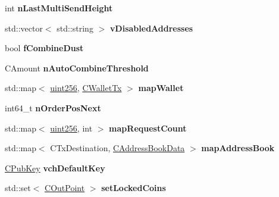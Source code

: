 \begin{DoxyCompactItemize}
\item 
\mbox{\label{class_c_wallet_a600b9d6c61622bf8d21f41c9968cbdc4}} 
int {\bfseries n\+Last\+Multi\+Send\+Height}
\item 
\mbox{\label{class_c_wallet_afe3c81e6c9b2f2ba6708b472a59ef068}} 
std\+::vector$<$ std\+::string $>$ {\bfseries v\+Disabled\+Addresses}
\item 
\mbox{\label{class_c_wallet_a38e534e987fa3401fda1fe060f6ca8ec}} 
bool {\bfseries f\+Combine\+Dust}
\item 
\mbox{\label{class_c_wallet_a8a2c5329bc450c6fc9b0762492b4b5e0}} 
C\+Amount {\bfseries n\+Auto\+Combine\+Threshold}
\item 
\mbox{\label{class_c_wallet_a0b17f72f2170090f2de43a6c48af3214}} 
std\+::map$<$ \mbox{\hyperlink{classuint256}{uint256}}, \mbox{\hyperlink{class_c_wallet_tx}{C\+Wallet\+Tx}} $>$ {\bfseries map\+Wallet}
\item 
\mbox{\label{class_c_wallet_af56cb17b19742506fc8d9449fc60884e}} 
int64\+\_\+t {\bfseries n\+Order\+Pos\+Next}
\item 
\mbox{\label{class_c_wallet_ade5f0fc0e722433b421c32f97bd873a8}} 
std\+::map$<$ \mbox{\hyperlink{classuint256}{uint256}}, int $>$ {\bfseries map\+Request\+Count}
\item 
\mbox{\label{class_c_wallet_a360f527f08dfaaa29e3a8c9950b30905}} 
std\+::map$<$ C\+Tx\+Destination, \mbox{\hyperlink{class_c_address_book_data}{C\+Address\+Book\+Data}} $>$ {\bfseries map\+Address\+Book}
\item 
\mbox{\label{class_c_wallet_a6d415899e530a91e6e28dd0fa4ecef8d}} 
\mbox{\hyperlink{class_c_pub_key}{C\+Pub\+Key}} {\bfseries vch\+Default\+Key}
\item 
\mbox{\label{class_c_wallet_a658aebcd4c617f5a29f5df3d8878c450}} 
std\+::set$<$ \mbox{\hyperlink{class_c_out_point}{C\+Out\+Point}} $>$ {\bfseries set\+Locked\+Coins}
\item 
\mbox{\label{class_c_wallet_a817c0d1034377a7bd70a714140a5a8ca}} 

\end{DoxyCompactItemize}
